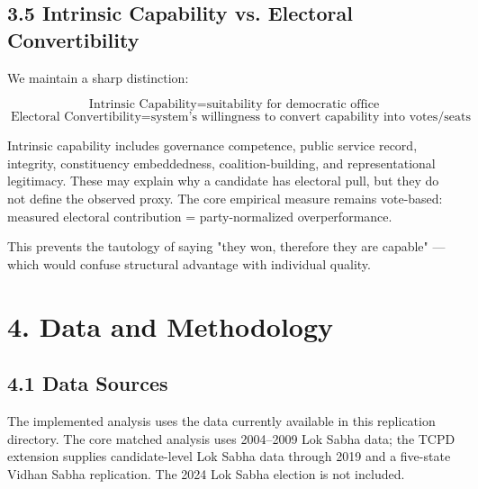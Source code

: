 \documentclass[
]{article}
\begin{document}
\subsection{3.5 Intrinsic Capability vs. Electoral Convertibility}\label{35-intrinsic-capability-vs-electoral-convertibility}

We maintain a sharp distinction:

\[\text{Intrinsic Capability} = \text{suitability for democratic office}\] \[\text{Electoral Convertibility} = \text{system's willingness to convert capability into votes/seats}\]

Intrinsic capability includes governance competence, public service record, integrity, constituency embeddedness, coalition-building, and representational legitimacy. These may explain why a candidate has electoral pull, but they do not define the observed proxy. The core empirical measure remains vote-based: measured electoral contribution = party-normalized overperformance.

This prevents the tautology of saying "they won, therefore they are capable" --- which would confuse structural advantage with individual quality.

\section{4. Data and Methodology}\label{4-data-and-methodology}

\subsection{4.1 Data Sources}\label{41-data-sources}

The implemented analysis uses the data currently available in this replication directory. The core matched analysis uses 2004--2009 Lok Sabha data; the TCPD extension supplies candidate-level Lok Sabha data through 2019 and a five-state Vidhan Sabha replication. The 2024 Lok Sabha election is not included.
\end{document}

